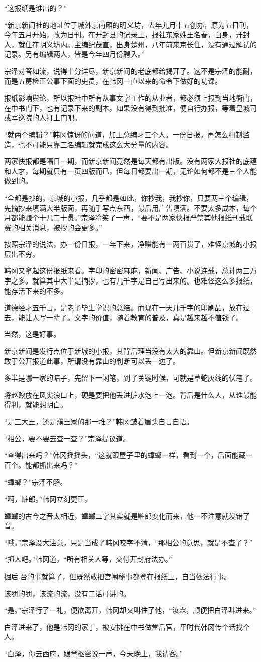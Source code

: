 “这报纸是谁出的？”

“新京新闻社的地址位于城外京南厢的明义坊，去年九月十五创办，原为五日刊，今年五月开始，改为日刊。在开封县的记录上，报社东家姓王名春，白身，开封人，就住在明义坊内。主编纪茂直，出身楚州，八年前来京长住，没有通过解试的记录。另有编辑两人，皆是今年四月份聘入。”

宗泽对答如流，说得十分详尽，新京新闻的老底都给揭开了。这不是宗泽的能耐，而是五房检正公事下面的吏员，在韩冈一直以来的命令下做好的功课。

报纸影响舆论，所以报社中所有从事文字工作的从业者，都必须上报到当地衙门，在中书门下，也有记录下来的副本。如果没有得到批准，便自行办报，等着皇城司或军巡院的人打上门吧。

“就两个编辑？”韩冈惊讶的问道，加上总编才三个人。一份日报，再怎么粗制滥造，也不可能只靠三名编辑就完成这么大分量的内容。

两家快报都是隔日一期，而新京新闻竟然是每天都有出版。没有两家大报社的底蕴和人才，每期就只有一页四版而已，但每日都要出一期，无论如何都不是三个人能做到的。

“全都是抄的。京城的小报，几乎都是如此，你抄我，我抄你，只要两三个编辑，先摘抄来填满大半版面，再随手写点东西，最后用广告填满。不要太多成本，每个月都能赚个十几二十贯。”宗泽冷笑了一声，“要不是两家快报严禁其他报纸刊载联赛的相关消息，被抄的会更多。”

按照宗泽的说法，办一份日报，一年下来，净赚能有一两百贯了，难怪京城的小报层出不穷。

韩冈又拿起这份报纸来看。字印的密密麻麻，新闻、广告、小说连载，总计两三万字之多。就算其中大半是摘抄，也有几千字是自己写出来的。也难怪这么多报纸，能存活下来的不多。

道德经才五千言，是老子毕生学识的总结。而现在一天几千字的印刷品，放在过去，能让人写一辈子。文字的价值，随着教育的普及，真是越来越不值钱了。

当然，这是好事。

新京新闻是发行点位于新城的小报，其背后理当没有太大的靠山。但新京新闻既然敢于公开报道此事，所谓没有靠山的判断可以丢一边了。

多半是哪一家的暗子，先留下一闲笔，到了关键时候，可就是草蛇灰线的伏笔了。

将赵煦放在风尖浪口上，硬是要把他丢进脏水泡上一泡。背后是什么人，从谁最能得利，就能想明白。

“是三大王，还是濮王家的那一堆？”韩冈皱着眉头自言自语。

“相公，要不要去查一查？”宗泽提议道。

“查得出来吗？”韩冈摇摇头，“这就跟屋子里的蟑螂一样，看到一个，后面能藏一百个。能都抓出来吗？”

“蟑螂？”宗泽不解。

“啊，赃郎。”韩冈立刻更正。

蟑螂的古今之音太相近，蟑螂二字其实就是赃郎变化而来，他一不注意就发错了音。

“哦。”宗泽没大注意，只是当成了韩冈咬字不清，“那相公的意思，就是不查了？”

“抓人吧。”韩冈道，“所有相关人等，交付开封府法办。”

掘后.台的事就算了，但既然敢把宫闱秘事都登在报纸上，自当依法行事。

该罚的罚，该流的流，没有二话可讲的。

“是。”宗泽行了一礼，便欲离开，韩冈却又叫住了他，“汝霖，顺便把白泽叫进来。”

白泽进来了，他是韩冈的家丁，被安排在中书做堂后官，平时代韩冈传个话找个人。

“白泽，你去西府，跟章枢密说一声，今天晚上，我请客。”
